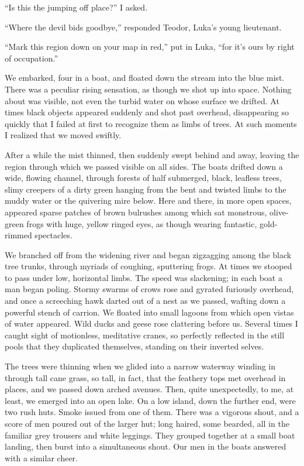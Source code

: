 \documentclass[a5paper,12pt]{book}
\begin{document}
“Is this the jumping off place?” I asked.

“Where the devil bids goodbye,” responded Teodor, Luka’s young lieutenant.

“Mark this region down on your map in red,” put in Luka, “for it’s ours by right of occupation.”

We embarked, four in a boat, and floated down the stream into the blue mist. There was a peculiar rising sensation, as though we shot up into space. Nothing about was visible, not even the turbid water on whose surface we drifted. At times black objects appeared suddenly and shot past overhead, disappearing so quickly that I failed at first to recognize them as limbs of trees. At such moments I realized that we moved swiftly.

After a while the mist thinned, then suddenly swept behind and away, leaving the region through which we passed visible on all sides. The boats drifted down a wide, flowing channel, through forests of half submerged, black, leafless trees, slimy creepers of a dirty green hanging from the bent and twisted limbs to the muddy water or the quivering mire below. Here and there, in more open spaces, appeared sparse patches of brown bulrushes among which sat monstrous, olive-green frogs with huge, yellow ringed eyes, as though wearing fantastic, gold-rimmed spectacles.

We branched off from the widening river and began zigzagging among the black tree trunks, through myriads of coughing, sputtering frogs. At times we stooped to pass under low, horizontal limbs. The speed was slackening; in each boat a man began poling. Stormy swarms of crows rose and gyrated furiously overhead, and once a screeching hawk darted out of a nest as we passed, wafting down a powerful stench of carrion. We floated into small lagoons from which open vistas of water appeared. Wild ducks and geese rose clattering before us. Several times I caught sight of motionless, meditative cranes, so perfectly reflected in the still pools that they duplicated themselves, standing on their inverted selves.

The trees were thinning when we glided into a narrow waterway winding in through tall cane grass, so tall, in fact, that the feathery tops met overhead in places, and we passed down arched avenues. Then, quite unexpectedly, to me, at least, we emerged into an open lake. On a low island, down the further end, were two rush huts. Smoke issued from one of them. There was a vigorous shout, and a score of men poured out of the larger hut; long haired, some bearded, all in the familiar grey trousers and white leggings. They grouped together at a small boat landing, then burst into a simultaneous shout. Our men in the boats answered with a similar cheer.
\end{document}
